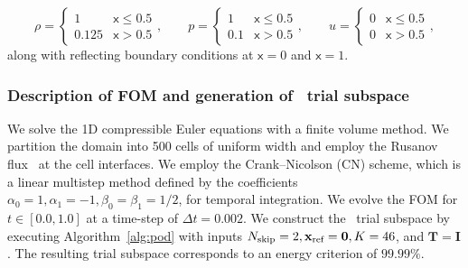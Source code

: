 \begin{equation*}
\rho = 
\begin{cases} 
      1 & \mathsf{x}\leq 0.5 \\
      0.125 & \mathsf{x} > 0.5 
   \end{cases},
\qquad
p = 
\begin{cases} 
      1 & \mathsf{x}\leq 0.5 \\
      0.1 & \mathsf{x} > 0.5 
   \end{cases},
\qquad
u = 
\begin{cases} 
      0 & \mathsf{x}\leq 0.5 \\
      0 & \mathsf{x} > 0.5 
   \end{cases},
\end{equation*}
along with reflecting boundary conditions at $\mathsf{x}=0$ and $\mathsf{x}=1$. 

\subsubsection{Description of FOM and generation of \spatialAcronym\ trial subspace}\label{sec:sod_fom}
We solve the 1D compressible Euler equations with a finite volume method. We partition the domain into 500 cells of uniform width and employ the Rusanov flux~\cite{rusanov} at the cell interfaces. We employ the Crank--Nicolson (CN) scheme, which is a linear multistep method defined by the coefficients $\alpha_0 = 1,\alpha_1 = -1, \beta_0 = \beta_1 = 1/2$, for temporal integration. We evolve the FOM for $t \in [0.0,1.0]$ at a time-step of $\Delta t = 0.002$. We construct the \spatialAcronym\ trial subspace by executing Algorithm~\ref{alg:pod} with inputs $N_{\text{skip}}=2, \mathbf{x}_\text{ref} = \boldsymbol 0, K=46 $, and $\mathbf{T} = \mathbf{I}$. The resulting trial subspace corresponds to an energy criterion of $99.99\%$.

